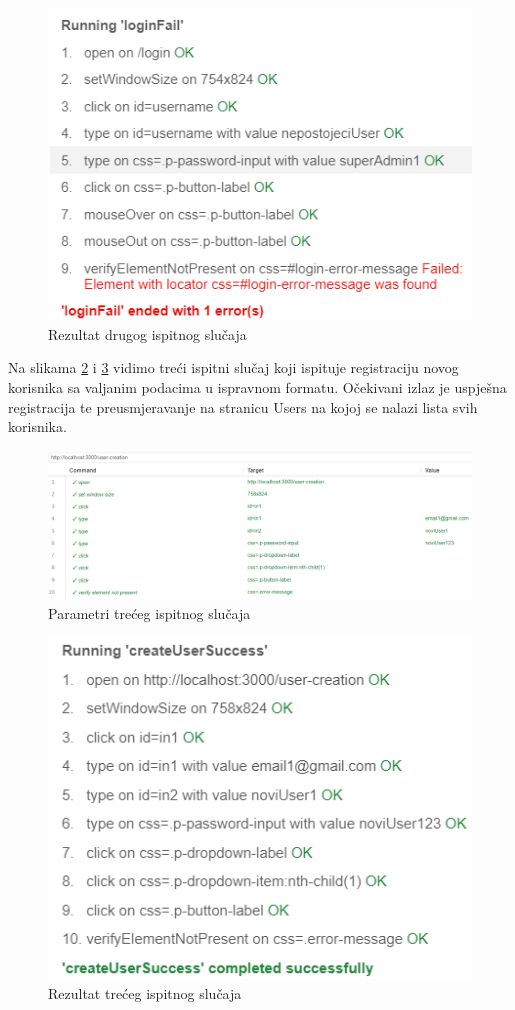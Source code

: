                  \begin{figure}[H]
                 \centering
				\includegraphics[width=0.5\linewidth]{slike/loginFail.png}
				\caption{Rezultat drugog ispitnog slučaja}
				\label{fig:Result2}
			\end{figure}
			\eject

            Na slikama \ref{fig:Params3} i \ref{fig:Result3} vidimo treći ispitni slučaj koji ispituje registraciju novog korisnika sa valjanim podacima u ispravnom formatu. Očekivani izlaz je uspješna registracija te preusmjeravanje na stranicu Users na kojoj se nalazi lista svih korisnika.

                \begin{figure}[H]
                \centering
				\includegraphics[width=\linewidth]{slike/registerSuccessParams.png}
				\caption{Parametri trećeg ispitnog slučaja }
				\label{fig:Params3}
			\end{figure}
   
                 \begin{figure}[H]
                 \centering
				\includegraphics[width=0.5\linewidth]{slike/registerSuccess.png}
				\caption{Rezultat trećeg ispitnog slučaja}
				\label{fig:Result3}
			\end{figure}
			\newpage

